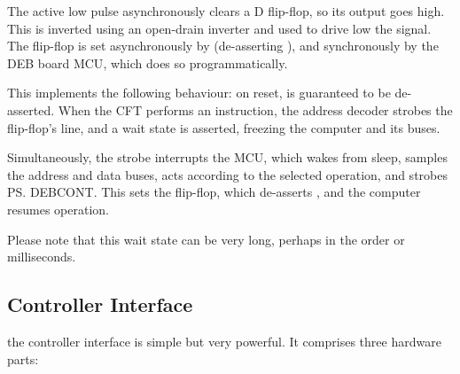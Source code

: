The active low pulse asynchronously clears a D flip-flop, so its
 output goes high. This is inverted using an open-drain inverter
and used to drive low the  signal. The flip-flop is set
asynchronously by  (de-asserting ), and synchronously
by the DEB board \gls{MCU}, which does so programmatically.

This implements the following behaviour: on reset,  is
guaranteed to be de-asserted. When the CFT performs an 
instruction, the address decoder strobes the flip-flop's 
line, and a wait state is asserted, freezing the computer and its buses.

Simultaneously, the strobe interrupts the \gls{MCU}, which wakes from
sleep, samples the address and data buses, acts according to the
selected operation, and strobes \ps{DEBCONT}. This sets the flip-flop,
which de-asserts , and the computer resumes operation.

Please note that this wait state can be very long, perhaps in the order
or milliseconds.

\subsection{Controller Interface}

the controller interface is simple but very powerful. It comprises
three hardware parts:


